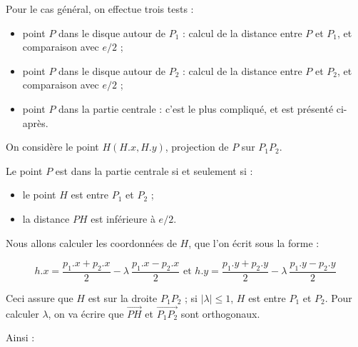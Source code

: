 Pour le cas général, on effectue trois tests :
\begin{itemize}
 \item point $P$ dans le disque autour de $P_1$ : calcul de la distance entre $P$ et $P_1$, et comparaison avec $e/2$ ;
 \item point $P$ dans le disque autour de $P_2$ : calcul de la distance entre $P$ et $P_2$, et comparaison avec $e/2$ ;
 \item point $P$ dans la partie centrale : c'est le plus compliqué, et est présenté ci-après. 
\end{itemize}

On considère le point $H (H.x, H.y)$, projection de $P$ sur $P_1P_2$.

\begin{center}
\end{center}

Le point $P$ est dans la partie centrale si et seulement si :
\begin{itemize}
  \item le point $H$ est entre $P_1$ et $P_2$ ;
  \item la distance $PH$ est inférieure à $e/2$.
\end{itemize}

Nous allons calculer les coordonnées de $H$, que l'on écrit sous la forme :

\begin{equation*}
h.x = \frac{p_1.x + p_2.x}{2} - \lambda ~ \frac{p_1.x - p_2.x}{2}\text{~et~}
h.y = \frac{p_1.y + p_2.y}{2} - \lambda ~ \frac{p_1.y - p_2.y}{2}
\end{equation*}

Ceci assure que $H$ est sur la droite $P_1P_2$ ; si $|\lambda|\leqslant1$, $H$ est entre $P_1$ et $P_2$. Pour calculer $\lambda$, on va écrire que $\overrightarrow{PH}$ et $\overrightarrow{P_1P_2}$ sont orthogonaux.

Ainsi :

